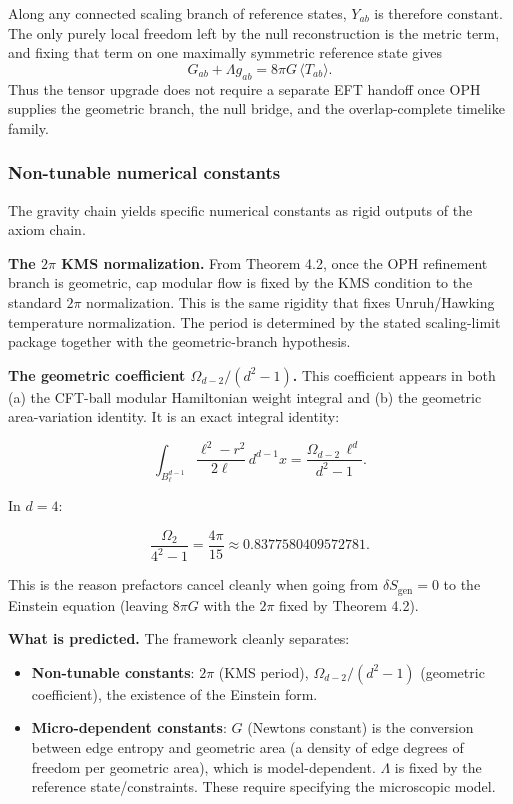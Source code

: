 Along any connected scaling branch of reference states, \(Y_{ab}\) is therefore constant. The only purely local freedom left by the null reconstruction is the metric term, and fixing that term on one maximally symmetric reference state gives
\[
G_{ab}+\Lambda g_{ab}=8\pi G\,\langle T_{ab}\rangle.
\]
Thus the tensor upgrade does not require a separate EFT handoff once OPH supplies the geometric branch, the null bridge, and the overlap-complete timelike family.

\subsubsection{Non-tunable numerical constants}\label{58-non-tunable-numerical-constants}

The gravity chain yields specific numerical constants as rigid outputs of the axiom chain.

\textbf{The \(2\pi\) KMS normalization.} From Theorem 4.2, once the OPH refinement branch is geometric, cap modular flow is fixed by the KMS condition to the standard \(2\pi\) normalization. This is the same rigidity that fixes Unruh/Hawking temperature normalization. The period is determined by the stated scaling-limit package together with the geometric-branch hypothesis.

\textbf{The geometric coefficient \(\Omega_{d-2}/(d^2 - 1)\).} This coefficient appears in both (a) the CFT-ball modular Hamiltonian weight integral and (b) the geometric area-variation identity. It is an exact integral identity:

\[
\int_{B^{d-1}_\ell} \frac{\ell^2 - r^2}{2\ell} \, d^{d-1}x
= \frac{\Omega_{d-2} \, \ell^d}{d^2 - 1}.
\]

In \(d = 4\):

\[
\frac{\Omega_2}{4^2 - 1} = \frac{4\pi}{15} \approx 0.8377580409572781.
\]

This is the reason prefactors cancel cleanly when going from \(\delta S_{\mathrm{gen}} = 0\) to the Einstein equation (leaving \(8\pi G\) with the \(2\pi\) fixed by Theorem 4.2).

\textbf{What is predicted.} The framework cleanly separates:

\begin{itemize}
\tightlist
\item
  \textbf{Non-tunable constants}: \(2\pi\) (KMS period), \(\Omega_{d-2}/(d^2-1)\) (geometric coefficient), the existence of the Einstein form.
\item
  \textbf{Micro-dependent constants}: \(G\) (Newton\textquotesingle s constant) is the conversion between edge entropy and geometric area (a density of edge degrees of freedom per geometric area), which is model-dependent. \(\Lambda\) is fixed by the reference state/constraints. These require specifying the microscopic model.
\end{itemize}

